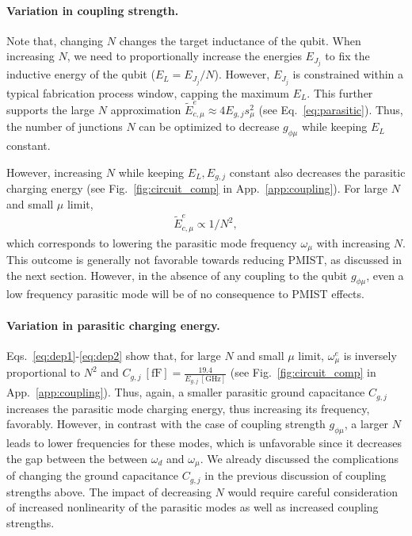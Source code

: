 \documentclass[%
reprint,
superscriptaddress,
 amsmath,amssymb,
 aps,
 prx,
longbibliography,
floatfix,
]{revtex4-2}
\begin{document}
\paragraph{Variation in coupling strength.} Note that, changing $N$ changes the target inductance of the qubit. When increasing $N$, we need to proportionally increase the energies $E_{J_j}$ to fix the inductive energy of the qubit ($E_L=E_{J_j}/N$). However, $E_{J_j}$ is constrained within a typical fabrication process window, capping the maximum $E_{L}$. This further supports the large $N$ approximation $\tilde{E}_{c,\mu}^e\approx 4E_{g,j}s_\mu^2$ (see Eq.~\ref{eq:parasitic}). Thus, the number of junctions $N$ can be optimized to decrease $g_{\phi\mu}$ while keeping $E_L$ constant. 

However, increasing $N$ while keeping $E_L, E_{g,j}$ constant also decreases the parasitic charging energy (see Fig.~\ref{fig:circuit_comp} in App.~\ref{app:coupling}). For large $N$ and small $\mu$ limit,
\begin{align}
\tilde{E}_{c,\mu}^e\propto 1/N^2,  \label{eq:dep2} 
\end{align}
which corresponds to lowering the parasitic mode frequency $\omega_\mu$ with increasing $N$. This outcome is generally not favorable towards reducing PMIST, as discussed in the next section. However, in the absence of any coupling to the qubit $g_{\phi\mu}$, even a low frequency parasitic mode will be of no consequence to PMIST effects.

\paragraph{Variation in parasitic charging energy.}  Eqs.~\ref{eq:dep1}-\ref{eq:dep2} show that, for large $N$ and small $\mu$ limit, $\omega_\mu^e$ is inversely proportional to $N^2$ and $C_{g,j} \ \mathrm{[fF]}=\frac{19.4}{E_{g,j} \ \mathrm{[GHz]}}$ (see Fig.~\ref{fig:circuit_comp} in App.~\ref{app:coupling}). Thus, again, a smaller parasitic ground capacitance $C_{g,j}$ increases the parasitic mode charging energy, thus increasing its frequency, favorably. However, in contrast with the case of coupling strength $g_{\phi\mu}$, a larger $N$ leads to lower frequencies for these modes, which is unfavorable since it decreases the gap between the between $\omega_d$ and $\omega_\mu$. We already discussed the complications of changing the ground capacitance $C_{g,j}$ in the previous discussion of coupling strengths above. The impact of decreasing $N$ would require careful consideration of increased nonlinearity of the parasitic modes as well as increased coupling strengths.
\end{document}
